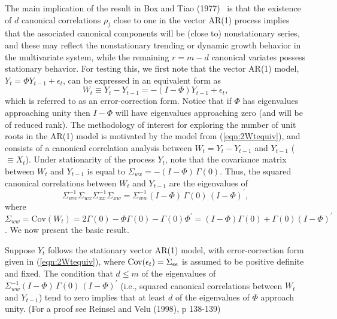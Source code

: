 The main implication of the result in Box and Tiao (1977)~\cite{box77} is that the existence of $d$ canonical correlations $\rho_j$ close to one in the vector AR(1) process implies that the associated canonical components will be (close to) nonstationary series, and these may reflect the nonstationary trending or dynamic growth behavior in the multivariate system, while the remaining $r = m-d$ canonical variates possess stationary behavior. For testing this, we first note that the vector AR(1) model, $Y_t = \Phi Y_{t-1} + \epsilon_t$, can be expressed in an equivalent form as
	\begin{equation}\label{eqn:2Wtequiv}
	W_t \equiv Y_t - Y_{t-1} = - (I - \Phi ) Y_{t-1} + \epsilon_t , 
	\end{equation}
which is referred to as an error-correction form.  Notice that if $\Phi$ has eigenvalues approaching unity then $I-\Phi$ will have eigenvalues approaching zero (and will be of reduced rank).  The methodology of interest for exploring the number of unit roots in the AR(1) model is motivated by the model from (\ref{eqn:2Wtequiv}), and consists of a canonical correlation analysis between $W_t = Y_t - Y_{t-1}$ and $Y_{t-1}$ ($\equiv X_t$).  Under stationarity of the process $Y_t$, note that the covariance matrix between $W_t$ and $Y_{t-1}$ is equal to $\Sigma_{wx} = - (I- \Phi )\, \Gamma (0)$.  Thus, the squared canonical correlations between $W_t$ and $Y_{t-1}$ are the eigenvalues of
	\begin{equation}\label{eqn:2doublesigma}
	\Sigma_{ww}^{-1} \Sigma_{wx} \Sigma_{xx}^{-1} \Sigma_{xw}= \Sigma_{ww}^{-1} (I- \Phi )\, \Gamma (0) \,(I- \Phi )^{\prime} , 
	\end{equation}
where $\Sigma_{ww} = \mbox{Cov}(W_t) = 2 \Gamma (0) - \Phi \Gamma (0) - \Gamma (0)\Phi^{\prime} = (I- \Phi )\Gamma (0) + \Gamma (0) (I- \Phi)^{\prime}$. We now present the basic result. \\


\begin{result}
Suppose $Y_t$ follows the stationary vector AR(1) model, with error-correction form given in (\ref{eqn:2Wtequiv}), where $\operatorname{Cov}(\epsilon_t) = \Sigma_{\epsilon \epsilon}$ is assumed to be positive definite and fixed. The condition that $d \leq m$ of the eigenvalues of $\Sigma_{ww}^{-1} (I- \Phi )\, \Gamma (0) \,(I- \Phi )^{\prime} $ (i.e., squared canonical correlations between $W_t$ and $Y_{t-1}$) tend to zero implies that at least $d$ of the eigenvalues of $\Phi$ approach unity. (For a proof see Reinsel and Velu (1998), p 138-139)~\cite{velurein}
\end{result}


